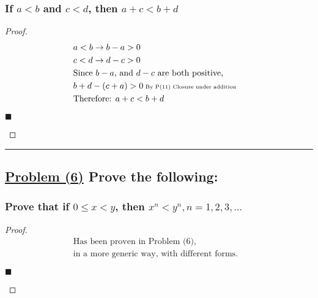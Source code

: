 \documentclass[letterpaper, 10 pt, conference]{ieeeconf}  %
\begin{document}
\subsubsection{\textbf{If $a < b$ and $c < d$, then $a + c < b + d$}}

\begin{proof}
\begin{align}
    &a < b \rightarrow b - a > 0 &&\\
    &c < d \rightarrow d - c > 0 &&\\
    &\text{\small{Since $b -a$, and $d - c $ are both positive,}} &&\\
    &b + d - (c + a) > 0  \text{\tiny{ By P(11) Closure under addition}} &&\\
    & \text{Therefore: } a + c < b + d &&
\end{align}
\begin{flushright}
$\blacksquare$
\end{flushright}
\end{proof}

\noindent\rule{8cm}{0.4pt}
\begin{figure}[thpb]
      \centering
\end{figure}
\subsection{\textbf{\underline{Problem (6)} Prove the following:}}

\subsubsection{\textbf{Prove that if $0 \leq x < y$, then $x^n < y^n, n = 1, 2, 3, \ldots $}}

\begin{proof}
\begin{align}
    & \text{Has been proven in Problem (6),} && \\
    & \text{in a more generic way, with different forms.}
\end{align}
\begin{flushright}
$\blacksquare$
\end{flushright}
\end{proof}










\newpage
\end{document}
